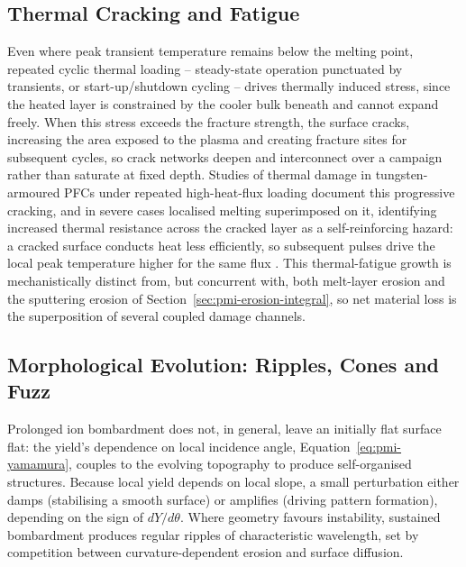 \subsection{Thermal Cracking and Fatigue}

Even where peak transient temperature remains below the melting point, repeated cyclic thermal loading -- steady-state operation punctuated by transients, or start-up/shutdown cycling -- drives thermally induced stress, since the heated layer is constrained by the cooler bulk beneath and cannot expand freely. When this stress exceeds the fracture strength, the surface cracks, increasing the area exposed to the plasma and creating fracture sites for subsequent cycles, so crack networks deepen and interconnect over a campaign rather than saturate at fixed depth. Studies of thermal damage in tungsten-armoured PFCs under repeated high-heat-flux loading document this progressive cracking, and in severe cases localised melting superimposed on it, identifying increased thermal resistance across the cracked layer as a self-reinforcing hazard: a cracked surface conducts heat less efficiently, so subsequent pulses drive the local peak temperature higher for the same flux \cite{ref0581}. This thermal-fatigue growth is mechanistically distinct from, but concurrent with, both melt-layer erosion and the sputtering erosion of Section~\ref{sec:pmi-erosion-integral}, so net material loss is the superposition of several coupled damage channels.

\subsection{Morphological Evolution: Ripples, Cones and Fuzz}

Prolonged ion bombardment does not, in general, leave an initially flat surface flat: the yield's dependence on local incidence angle, Equation~\eqref{eq:pmi-yamamura}, couples to the evolving topography to produce self-organised structures. Because local yield depends on local slope, a small perturbation either damps (stabilising a smooth surface) or amplifies (driving pattern formation), depending on the sign of $dY/d\theta$. Where geometry favours instability, sustained bombardment produces regular ripples of characteristic wavelength, set by competition between curvature-dependent erosion and surface diffusion.


